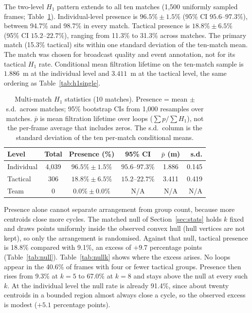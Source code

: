 The two-level $H_1$ pattern extends to all ten matches (1{,}500
uniformly sampled frames; Table~\ref{tab:h1multi}). Individual-level
presence is $96.5\%\pm1.5\%$ (95\% CI $95.6$--$97.3\%$), between 94.7\%
and 98.7\% in every match. Tactical presence is $18.8\%\pm6.5\%$ (95\%
CI $15.2$--$22.7\%$), ranging from 11.3\% to 31.3\% across matches. The
primary match (15.3\% tactical) sits within one standard deviation of
the ten-match mean. The match was chosen for broadcast quality and
event annotation, not for its tactical $H_1$ rate.
Conditional mean filtration lifetime on the ten-match sample is
$1.886$~m at the individual level and $3.411$~m at the tactical level,
the same ordering as Table~\ref{tab:h1single}.

\begin{table}[h]
\centering
\caption{Multi-match \texorpdfstring{$H_1$}{} statistics (10 matches).
Presence = mean \texorpdfstring{$\pm$}{} s.d.\ across matches; 95\%
bootstrap CIs from 1{,}000 resamples over matches.
$\bar{p}$ is mean filtration lifetime over loops
(\texorpdfstring{$\sum p / \sum H_1$}{}), not the per-frame average
that includes zeros. The s.d.\ column is the standard deviation of the
ten per-match conditional means.}
\label{tab:h1multi}
\begin{tabular}{@{}lccccr@{}}
\toprule
Level & Total & Presence (\%) & 95\% CI & $\bar{p}$ (m) & s.d. \\
\midrule
Individual & 4{,}039 & $96.5\%\pm1.5\%$ & $95.6$--$97.3\%$ & 1.886 & 0.145 \\
Tactical   & 306     & $18.8\%\pm6.5\%$ & $15.2$--$22.7\%$ & 3.411 & 0.419 \\
Team       & 0       & $0.0\%\pm0.0\%$  & N/A              & N/A   & N/A \\
\bottomrule
\end{tabular}
\end{table}

Presence alone cannot separate arrangement from group count, because
more centroids close more cycles. The matched null of
Section~\ref{sec:stats} holds $k$ fixed and draws points uniformly
inside the observed convex hull (hull vertices are not kept), so only
the arrangement is randomised. Against that null,
tactical presence is 18.8\% compared with 9.1\%, an excess of $+9.7$
percentage points (Table~\ref{tab:null}). Table~\ref{tab:nullk} shows
where the excess arises. No loops appear in the 40.6\% of frames with
four or fewer tactical groups. Presence then rises from 9.3\% at
$k=5$ to 67.0\% at $k=8$ and stays above the null at every such $k$.
At the individual level the null rate is already 91.4\%, since about
twenty centroids in a bounded region almost always close a cycle, so
the observed excess is modest ($+5.1$ percentage points).

